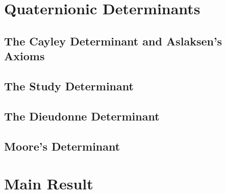 \section{Quaternionic Determinants}

\subsection{The Cayley Determinant and Aslaksen's Axioms}

\subsection{The Study Determinant}

\subsection{The Dieudonne Determinant}

\subsection{Moore's Determinant}

\section{Main Result}

